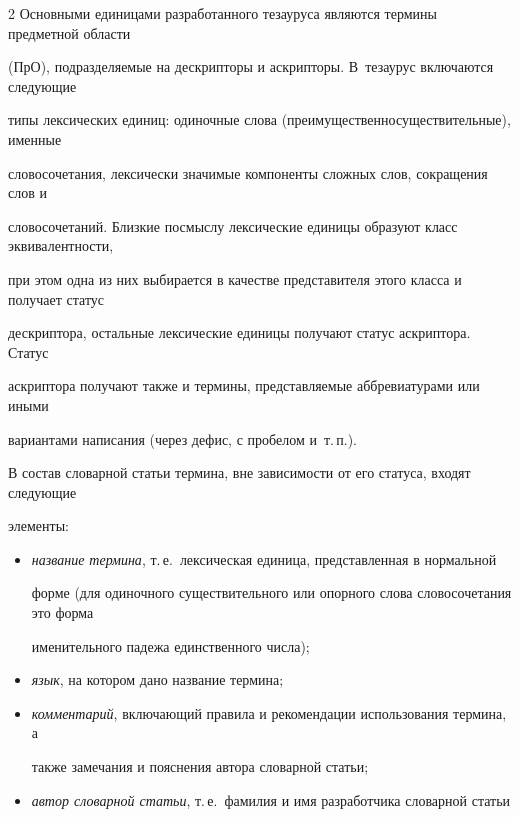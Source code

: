\begin{multicols}{2}
  Основными единицами разработанного тезауруса являются термины предметной области 

(ПрО), подразделяемые на дескрипторы и аскрипторы. В~тезаурус включаются следующие 

типы лексических единиц: одиночные слова (преимущественно\linebreak существительные), именные 

словосочетания, лексически значимые компоненты сложных слов, сокращения слов и 

словосочетаний. Близкие по\linebreak смыслу лексические единицы образуют класс эквивалентности, 

при этом одна из них выбирается в качестве представителя этого класса и получает статус 

дескриптора, остальные лексические единицы получают статус аскриптора. Статус 

аскриптора получают также и термины, представляемые аббревиатурами или иными 

вариантами написания (через дефис, с пробелом и~т.\,п.).

  

  В состав словарной статьи термина, вне зависимости от его статуса, входят следующие 

элементы:

\begin{itemize}

\item  \textit{название термина}, т.\,е.\ лексическая единица, представленная в нормальной 

форме (для одиночного существительного или опорного слова словосочетания это форма 

именительного падежа единственного числа);

  

  \item \textit{язык}, на котором дано название термина;

  \item

  \textit{комментарий}, включающий правила и рекомендации использования термина, а 

также замечания и пояснения автора словарной статьи;

  \item

  \textit{автор словарной статьи}, т.\,е.\ фамилия и имя разработчика словарной статьи 


\end{itemize}
\end{multicols}
